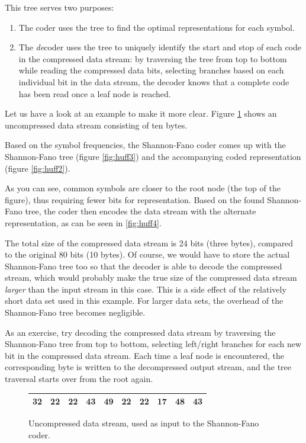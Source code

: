 \documentclass[a4paper,11pt,oneside]{report}
\begin{document}
This tree serves two purposes:
\begin{enumerate}
\item The coder uses the tree to find the optimal representations for
      each symbol.
\item The \emph{de}coder uses the tree to uniquely identify the start
      and stop of each code in the compressed data stream: by traversing
      the tree from top to bottom while reading the compressed data
      bits, selecting branches based on each individual bit in the data
      stream, the decoder knows that a complete code has been read once
      a leaf node is reached.
\end{enumerate}

Let us have a look at an example to make it more clear. Figure
\ref{fig:huff1} shows an uncompressed data stream consisting of ten
bytes.

Based on the symbol frequencies, the Shannon-Fano coder comes up with the
Shannon-Fano tree (figure \ref{fig:huff3}) and the accompanying coded
representation (figure \ref{fig:huff2}).

As you can see, common symbols are closer to the root node (the top
of the figure), thus requiring fewer bits for representation. Based
on the found Shannon-Fano tree, the coder then encodes the data stream
with the alternate representation, as can be seen in \ref{fig:huff4}.

The total size of the compressed data stream is 24 bits (three bytes),
compared to the original 80 bits (10 bytes). Of course, we would have
to store the actual Shannon-Fano tree too so that the decoder is able to decode
the compressed stream, which would probably make the true size of the
compressed data stream \emph{larger} than the input stream in this
case. This is a side effect of the relatively short data set used in
this example. For larger data sets, the overhead of the Shannon-Fano tree
becomes negligible.

As an exercise, try decoding the compressed data stream by traversing
the Shannon-Fano tree from top to bottom, selecting left/right branches for
each new bit in the compressed data stream. Each time a leaf node is
encountered, the corresponding byte is written to the decompressed
output stream, and the tree traversal starts over from the root again.

\begin{figure}[p]
\begin{center}
\begin{tabular}{|l|l|l|l|l|l|l|l|l|l|}\hline
32 & 22 & 22 & 43 & 49 & 22 & 22 & 17 & 48 & 43\\\hline
\end{tabular}
\end{center}
\caption{Uncompressed data stream, used as input to the Shannon-Fano coder.}
\label{fig:huff1}
\end{figure}
\end{document}
